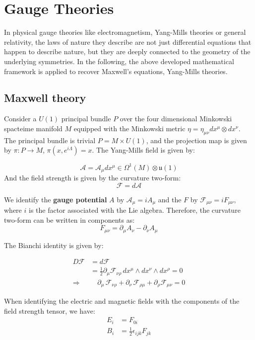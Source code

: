 
\chapter{Gauge Theories}

In physical gauge theories like electromagnetism, Yang-Mills theories or general relativity, the laws of nature they describe are not just differential equations that happen to describe nature, but they are deeply connected to the geometry of the underlying symmetries. In the following, the above developed mathematical framework is applied to recover Maxwell's equations, Yang-Mills theories.

\section{Maxwell theory}

Consider a $U(1)$ principal bundle $P$ over the four dimensional Minkowski spacteime manifold $M$ equipped with the Minkowski metric $\eta = \eta_{\mu\nu}dx^\mu \otimes dx^\nu$. The principal bundle is trivial $P = M \times U(1)$, and the projection map is given by $\pi: P \to M$, $\pi(x,e^{i\Lambda}) = x$. The Yang-Mills field is given by:

\[ \mathcal{A}= \mathcal{A}_\mu dx^\mu \in \Omega^1(M)\otimes \mathfrak{u}(1) \]
And the field strength is given by the curvature two-form:
\[ \mathscr{F} = d \mathcal{A} \]

We identify the \textbf{gauge potential} $A$ by $\mathcal{A}_\mu=iA_\mu$ and the  $F$ by $\mathscr{F}_{\mu\nu} = iF_{\mu\nu}$, where $i$ is the factor associated with the Lie algebra. Therefore, the curvature two-form can be written in components as:
\[ F_{\mu\nu} = \partial_\mu A_\nu - \partial_\nu A_\mu \]

The Bianchi identity is given by:

\begin{align*}
  D\mathscr{F} &= d\mathscr{F} \\
  &= \frac12\partial_\mu \mathscr{F}_{\nu\rho} \, dx^\mu \wedge dx^\nu \wedge dx^\rho = 0 \\
  \Rightarrow & \quad \partial_\mu \, \mathscr{F}_{\nu\rho} + \partial_\nu \, \mathscr{F}_{\rho\mu} + \partial_\rho \mathscr{F}_{\mu\nu} = 0
\end{align*}


When identifying the electric and magnetic fields with the components of the field strength tensor, we have:
\begin{align*}
  E_i &= F_{0i}\\
  B_i &= \frac12 \epsilon_{ijk} F_{jk} 
\end{align*}

